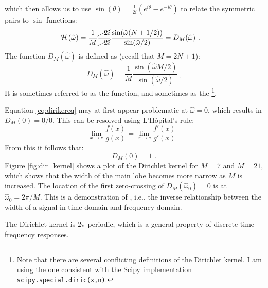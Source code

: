 \noindent which then allows us to use $\sin(\theta)=\frac{1}{2i}(e^{i\theta}-e^{-i\theta})$ 
to relate the symmetric pairs to $\sin$ functions:
\begin{align}
\mathcal{H}\left(\hat{\omega}\right) &= \frac{1}{M} \frac{\cancel{-2i}}{\cancel{-2i}} \frac{ \sin(\hat{\omega} (N+1/2)) }{\sin(\hat{\omega}/2)} = D_{M}(\hat{\omega}) \,\,.
\end{align}
The function $D_M(\hat{\omega})$ is defined as (recall that $M=2N+1$):
\begin{equation}
\boxed{
D_M(\hat{\omega}) = \frac{1}{M}\frac{ \sin(\hat{\omega}M/2) }{\sin(\hat{\omega}/2)}
}\label{eq:dirikereq} \,\, _.
\end{equation}
It is sometimes referred to as the \emph{} function, and sometimes as
the \emph{}\footnote{Note that there
are several conflicting definitions of the Dirichlet kernel. I am
using the one consistent with the Scipy
implementation \texttt{scipy.special.diric(x,n)}.}.

Equation \ref{eq:dirikereq} may at first appear problematic at
$\hat{\omega}=0$, which results in $D_M(0)=0/0$. 
This can be resolved using L'H\^opital's rule:
\begin{equation}
\lim_{x\rightarrow c} \frac{f(x)}{g(x)} = \lim_{x\rightarrow c} \frac{f'(x)}{g'(x)} \,\, _.
\end{equation}
From this it follows that:
\begin{equation}
D_M(0) = 1 \,\,.
\end{equation}
Figure \ref{fig:dir_kernel} shows a plot of the Dirichlet kernel for
$M=7$ and $M=21$, which shows that the width of the main lobe becomes
more narrow as $M$ is increased. The location of the first
zero-crossing of $D_M(\hat{\omega}_0)=0$ is at
$\hat{\omega}_0=2\pi/M$. This is a demonstration
of \emph{},
i.e., the inverse relationship between the width of a signal in time
domain and frequency domain.

\begin{marginfigure}
\begin{center}
\end{center}
\caption{The Dirichlet kernel is $2\pi$-periodic, which is a general property of discrete-time frequency responses.}
\label{fig:dir_kernel2}
\end{marginfigure}

